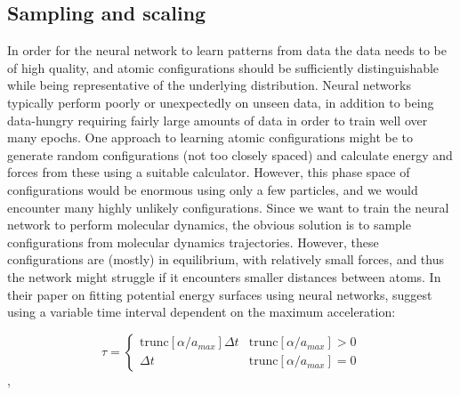 \subsection{Sampling and scaling}
In order for the neural network to learn patterns from data
the data needs to be of high quality, and atomic configurations
should be sufficiently distinguishable while being representative
of the underlying distribution. Neural networks typically perform
poorly or unexpectedly on unseen data, in addition to being data-hungry
requiring fairly large amounts of data in order to train well
over many epochs.
One approach to learning atomic configurations might be to generate
random configurations (not too closely spaced) and calculate energy
and forces from these using a suitable calculator. However, this
phase space of configurations would be enormous using only a few particles,
and we would encounter many highly unlikely configurations.
Since we want to train the neural network to perform molecular dynamics,
the obvious solution is to sample configurations from molecular dynamics
trajectories. However, these configurations are (mostly) in equilibrium, with
relatively small forces, and thus the network might struggle if
it encounters smaller distances between atoms.
In their paper on fitting potential energy surfaces using neural networks,
\parencite[Pukrittayakamee et al.]{pukrittayakamee2009simultaneous}
suggest using a variable time interval dependent on the maximum acceleration:

\begin{equation}
    \tau = 
    \begin{cases}
        \text{trunc}[\alpha / a_{max}]\Delta t & \text{trunc}
        [\alpha / a_{max}] > 0 \\
        \Delta t & \text{trunc}
        [\alpha / a_{max}] = 0
    \end{cases}
\end{equation},

